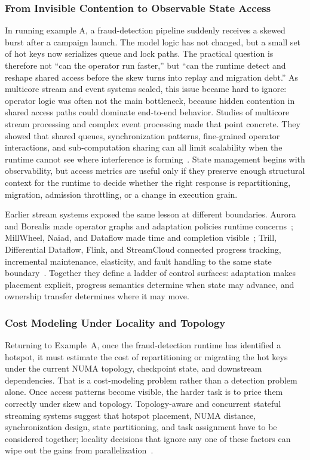 \documentclass[manuscript,nonacm]{acmart}
\begin{document}
\subsubsection{From Invisible Contention to Observable State Access}

In running example A, a fraud-detection pipeline suddenly receives a skewed burst after a campaign launch. The model logic has not changed, but a small set of hot keys now serializes queue and lock paths. The practical question is therefore not ``can the operator run faster,'' but ``can the runtime detect and reshape shared access before the skew turns into replay and migration debt.'' As multicore stream and event systems scaled, this issue became hard to ignore: operator logic was often not the main bottleneck, because hidden contention in shared access paths could dominate end-to-end behavior. Studies of multicore stream processing and complex event processing made that point concrete. They showed that shared queues, synchronization patterns, fine-grained operator interactions, and sub-computation sharing can all limit scalability when the runtime cannot see where interference is forming~\cite{zhang2017revisiting,zhang2017mqo}. State management begins with observability, but access metrics are useful only if they preserve enough structural context for the runtime to decide whether the right response is repartitioning, migration, admission throttling, or a change in execution grain.

Earlier stream systems exposed the same lesson at different boundaries. Aurora and Borealis made operator graphs and adaptation policies runtime concerns~\cite{abadi2003aurora,abadi2005borealis}; MillWheel, Naiad, and Dataflow made time and completion visible~\cite{akidau2013millwheel,murray2013naiad,akidau2015dataflow}; Trill, Differential Dataflow, Flink, and StreamCloud connected progress tracking, incremental maintenance, elasticity, and fault handling to the same state boundary~\cite{chandramouli2014trill,murray2013differential,carbone2015flink,gulisano2012streamcloud}. Together they define a ladder of control surfaces: adaptation makes placement explicit, progress semantics determine when state may advance, and ownership transfer determines where it may move.

\subsubsection{Cost Modeling Under Locality and Topology}

Returning to Example~A, once the fraud-detection runtime has identified a hotspot, it must estimate the cost of repartitioning or migrating the hot keys under the current NUMA topology, checkpoint state, and downstream dependencies. That is a cost-modeling problem rather than a detection problem alone. Once access patterns become visible, the harder task is to price them correctly under skew and topology. Topology-aware and concurrent stateful streaming systems suggest that hotspot placement, NUMA distance, synchronization design, state partitioning, and task assignment have to be considered together; locality decisions that ignore any one of these factors can wipe out the gains from parallelization~\cite{zhang2019briskstream,zhang2020concurrent}.
\end{document}
